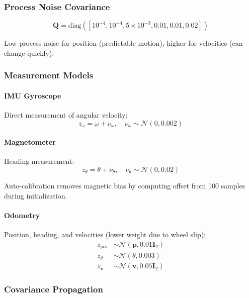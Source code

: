 \documentclass[11pt,a4paper]{article}
\begin{document}
\subsubsection{Process Noise Covariance}

\begin{equation}
\mathbf{Q} = \text{diag}([10^{-4}, 10^{-4}, 5 \times 10^{-3}, 0.01, 0.01, 0.02])
\end{equation}

Low process noise for position (predictable motion), higher for velocities (can change quickly).

\subsubsection{Measurement Models}

\paragraph{IMU Gyroscope}
Direct measurement of angular velocity:
\begin{equation}
z_\omega = \omega + \nu_\omega, \quad \nu_\omega \sim \mathcal{N}(0, 0.002)
\end{equation}

\paragraph{Magnetometer}
Heading measurement:
\begin{equation}
z_\theta = \theta + \nu_\theta, \quad \nu_\theta \sim \mathcal{N}(0, 0.02)
\end{equation}

Auto-calibration removes magnetic bias by computing offset from 100 samples during initialization.

\paragraph{Odometry}
Position, heading, and velocities (lower weight due to wheel slip):
\begin{align}
z_{\text{pos}} &\sim \mathcal{N}(\mathbf{p}, 0.01 \mathbf{I}_2) \nonumber \\
z_\theta &\sim \mathcal{N}(\theta, 0.003) \nonumber \\
z_{\mathbf{v}} &\sim \mathcal{N}(\mathbf{v}, 0.05 \mathbf{I}_2) \nonumber
\end{align}

\subsubsection{Covariance Propagation}
\end{document}
